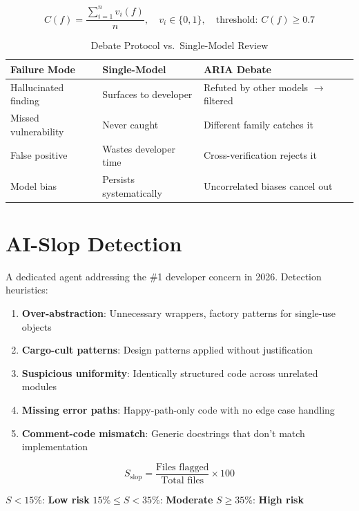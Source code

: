 \documentclass[12pt,a4paper]{article}
\begin{document}
$$C(f) = \frac{\sum_{i=1}^{n} v_i(f)}{n}, \quad v_i \in \{0, 1\}, \quad \text{threshold: } C(f) \geq 0.7$$

\begin{table}[H]
\centering
\caption{Debate Protocol vs.\ Single-Model Review}
\begin{tabularx}{\textwidth}{lXX}
\toprule
\textbf{Failure Mode} & \textbf{Single-Model} & \textbf{ARIA Debate} \\
\midrule
Hallucinated finding & Surfaces to developer & Refuted by other models $\rightarrow$ filtered \\
Missed vulnerability & Never caught & Different family catches it \\
False positive & Wastes developer time & Cross-verification rejects it \\
Model bias & Persists systematically & Uncorrelated biases cancel out \\
\bottomrule
\end{tabularx}
\end{table}

\section{AI-Slop Detection}

A dedicated agent addressing the \#1 developer concern in 2026. Detection heuristics:

\begin{enumerate}
    \item \textbf{Over-abstraction}: Unnecessary wrappers, factory patterns for single-use objects
    \item \textbf{Cargo-cult patterns}: Design patterns applied without justification
    \item \textbf{Suspicious uniformity}: Identically structured code across unrelated modules
    \item \textbf{Missing error paths}: Happy-path-only code with no edge case handling
    \item \textbf{Comment-code mismatch}: Generic docstrings that don't match implementation
\end{enumerate}

$$S_{\text{slop}} = \frac{\text{Files flagged}}{\text{Total files}} \times 100$$

$S < 15\%$: \textcolor{codegreen}{\textbf{Low risk}} \quad
$15\% \leq S < 35\%$: \textcolor{codeorange}{\textbf{Moderate}} \quad
$S \geq 35\%$: \textcolor{codered}{\textbf{High risk}}
\end{document}
